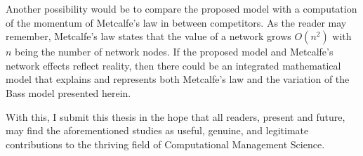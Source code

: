 Another possibility would be to compare the proposed model with a computation of the momentum of Metcalfe’s law in between competitors.  As the reader may remember, Metcalfe’s law states that the value of a network grows $O(n^2)$ with $n$ being the number of network nodes.   If the proposed model and Metcalfe’s network effects reflect reality, then there could be an integrated mathematical model that explains and represents both Metcalfe’s law and the variation of the Bass model presented herein.

With this, I submit this thesis in the hope that all readers, present and future, may find the aforementioned studies as useful, genuine, and legitimate contributions to the thriving field of Computational Management Science.
